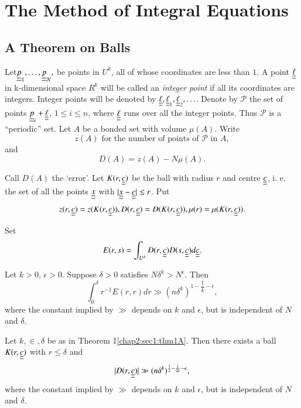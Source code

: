 \chapter{The Method of Integral Equations}\label{chap2}

\section{A Theorem on Balls}\label{chap2:sec1}

Let\pageoriginale $\underline{\underline{p}}_{1}, \ldots, \underline{\underline{p}}_{N},$ be points in $U^{k}$, all of whose coordinates are less than $1$. A point $\underline{\underline{\ell}}$ in k-dimensional space $R^{k}$ will be called an {\em integer point} if all its coordinates are integers. Integer points will be denoted by $\underline{\underline{\ell}}, \underline{\underline{\ell}}_{1}, \underline{\underline{\ell}}_{2}, \ldots$. Denote by $\mathscr{P}$ the set of points $\underline{\underline{p}}_{i} + \underline{\underline{\ell}}$, $1 \leq i \leq n$, where $\underline{\underline{\ell}}$ runs over all the integer points. Thus $\mathscr{P}$ is a ``periodic'' set. Let $A$ be a bonded set with volume $\mu(A)$. Write
$$
z(A) \text{ for the number of points of } \mathscr{P} \text{ in }A,
$$
and 
$$
D(A) = z(A) - N\mu(A).
$$

Call $D(A)$ the `error'. Let $K(r, \underline{\underline{c}})$ be the ball with radius $r$ and centre $\underline{\underline{c}}$, i. e. the set of all the points $\underline{\underline{x}}$ with $|\underline{\underline{x}} - \underline{\underline{c}}| \leq r$. Put
$$
z(r, \underline{\underline{c}}) = z(K(r, \underline{\underline{c}})), D(r, \underline{\underline{c}}) = D(K(r, \underline{\underline{c}})), \mu(r) = \mu(K(r, \underline{\underline{c}})).
$$ 

Set
$$
E(r, s) = \int_{U^{k}} D(r, \underline{\underline{c}}) D(s, \underline{\underline{c}}) d\underline{\underline{c}}.
$$

\begin{theorem}\label{chap2:sec1:thm1A}
 Let $k > 0$, $\epsilon > 0$. Suppose $\delta > 0$ satisfies $N \delta^{k} > N^{\epsilon}$. Then
$$
\int_{0}^{\delta} r^{-1} E(r, r)dr \gg (n \delta^{k})^{1 - \dfrac{1}{k} - \epsilon},
$$
where the constant implied by $\gg$ depends on $k$ and $\epsilon$, but is independent of $N$ and $\delta$.
\end{theorem}

\begin{theorem}\label{chap2:sec1:thm1B}
Let $k, \in, \delta$ be as in Theorem 1\ref{chap2:sec1:thm1A}. Then there exists a ball $K(r, \underline{\underline{c}})$ with $r \leq \delta$ and
$$
|D(r, \underline{\underline{c}})| \gg (n \delta^{k})^{\frac{1}{2} - \frac{1}{2k} - \epsilon},
$$\pageoriginale
where the constant implied by $\gg$ depends on $k$ and $\epsilon$, but is independent of $N$ and $\delta$.
\end{theorem}

